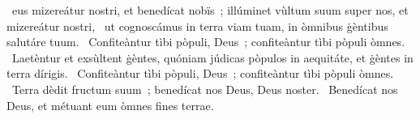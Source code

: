 { }
{%
~eus mizereátur nostri, et benedícat nobïs~; illúminet vùltum suum super nos, et mizereátur nostri, 
~ut cognoscámus in terra viam tuam, in òmnibus ġèntibus salutáre tuum. 
~Confiteàntur tìbi pòpuli, Deus~; confiteàntur tìbi pòpuli òmnes. 
~Laetèntur et exsùltent ġèntes, quóniam júdicas pòpulos in aequitáte, et ġèntes in terra dírigis. 
~Confiteàntur tìbi pòpuli, Deus~; confiteàntur tìbi pòpuli òmnes. 
~Terra dèdit fructum suum~; benedícat nos Deus, Deus noster. 
~Benedícat nos Deus, et métuant eum òmnes fines terrae. 
}
